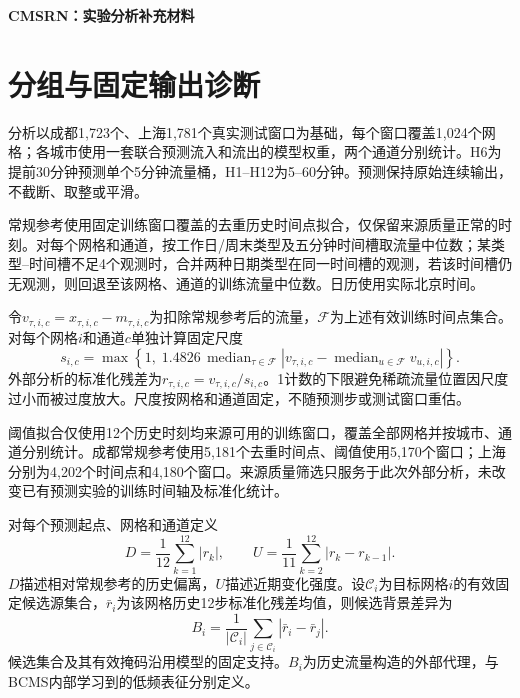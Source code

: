 \documentclass[UTF8,a4paper,zihao=-4,fontset=fandol]{ctexart}
\begin{document}
\begin{center}\Large\bfseries CMSRN：实验分析补充材料\end{center}

\section{分组与固定输出诊断}

分析以成都1,723个、上海1,781个真实测试窗口为基础，每个窗口覆盖1,024个网格；各城市使用一套联合预测流入和流出的模型权重，两个通道分别统计。H6为提前30分钟预测单个5分钟流量桶，H1--H12为5--60分钟。预测保持原始连续输出，不截断、取整或平滑。

常规参考使用固定训练窗口覆盖的去重历史时间点拟合，仅保留来源质量正常的时刻。对每个网格和通道，按工作日/周末类型及五分钟时间槽取流量中位数；某类型--时间槽不足4个观测时，合并两种日期类型在同一时间槽的观测，若该时间槽仍无观测，则回退至该网格、通道的训练流量中位数。日历使用实际北京时间。

令\(v_{\tau,i,c}=x_{\tau,i,c}-m_{\tau,i,c}\)为扣除常规参考后的流量，\(\mathcal F\)为上述有效训练时间点集合。对每个网格\(i\)和通道\(c\)单独计算固定尺度
\begin{equation}
 s_{i,c}=\max\!\left\{1,\;1.4826\,\operatorname{median}_{\tau\in\mathcal F}
 \left|v_{\tau,i,c}-\operatorname{median}_{u\in\mathcal F}v_{u,i,c}\right|\right\}.
\end{equation}
外部分析的标准化残差为\(r_{\tau,i,c}=v_{\tau,i,c}/s_{i,c}\)。1计数的下限避免稀疏流量位置因尺度过小而被过度放大。尺度按网格和通道固定，不随预测步或测试窗口重估。

阈值拟合仅使用12个历史时刻均来源可用的训练窗口，覆盖全部网格并按城市、通道分别统计。成都常规参考使用5,181个去重时间点、阈值使用5,170个窗口；上海分别为4,202个时间点和4,180个窗口。来源质量筛选只服务于此次外部分析，未改变已有预测实验的训练时间轴及标准化统计。

对每个预测起点、网格和通道定义
\begin{equation}
  D=\frac{1}{12}\sum_{k=1}^{12}|r_k|,
  \qquad U=\frac{1}{11}\sum_{k=2}^{12}|r_k-r_{k-1}|.
\end{equation}
\(D\)描述相对常规参考的历史偏离，\(U\)描述近期变化强度。设\(\mathcal{C}_i\)为目标网格\(i\)的有效固定候选源集合，\(\bar r_i\)为该网格历史12步标准化残差均值，则候选背景差异为
\begin{equation}
  B_i=\frac{1}{|\mathcal{C}_i|}\sum_{j\in\mathcal{C}_i}|\bar r_i-\bar r_j|.
\end{equation}
候选集合及其有效掩码沿用模型的固定支持。\(B_i\)为历史流量构造的外部代理，与BCMS内部学习到的低频表征分别定义。
\end{document}
